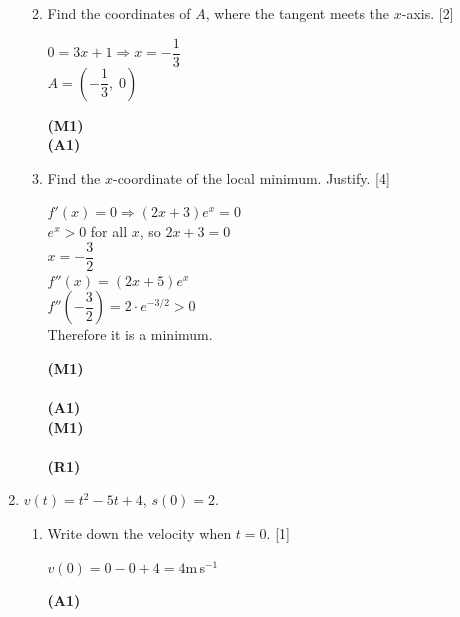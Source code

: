 \documentclass[12pt, twoside]{article}
\begin{document}
\begin{enumerate}[itemsep=0.2cm]
\begin{enumerate}[itemsep=0.3cm]
  \medskip
  \item Find the coordinates of $A$, where the tangent meets the $x$-axis. \hfill [2]

  \begin{minipage}[t]{0.62\textwidth}
  $0 = 3x + 1 \Rightarrow x = -\dfrac{1}{3}$\\[0.2cm]
  $A = \left(-\dfrac{1}{3},\; 0\right)$
  \end{minipage}%
  \begin{minipage}[t]{0.35\textwidth}\raggedleft
  \textbf{(M1)}\\[0.2cm]
  \textbf{(A1)}
  \end{minipage}

  \medskip
  \item Find the $x$-coordinate of the local minimum. Justify. \hfill [4]

  \begin{minipage}[t]{0.62\textwidth}
  $f'(x) = 0 \Rightarrow (2x + 3)e^x = 0$\\[0.15cm]
  $e^x > 0$ for all $x$, so $2x + 3 = 0$\\[0.15cm]
  $x = -\dfrac{3}{2}$\\[0.2cm]
  $f''(x) = (2x + 5)e^x$\\[0.15cm]
  $f''\!\left(-\dfrac{3}{2}\right) = 2 \cdot e^{-3/2} > 0$\\[0.15cm]
  Therefore it is a minimum.
  \end{minipage}%
  \begin{minipage}[t]{0.35\textwidth}\raggedleft
  \textbf{(M1)}\\[0.15cm]
  ~\\[0.15cm]
  \textbf{(A1)}\\[0.2cm]
  \textbf{(M1)}\\[0.15cm]
  ~\\[0.15cm]
  \textbf{(R1)}
  \end{minipage}
\end{enumerate}

\bigskip

\item $v(t) = t^2 - 5t + 4$, \quad $s(0) = 2$.

\begin{enumerate}[itemsep=0.3cm]
  \item Write down the velocity when $t = 0$. \hfill [1]

  \begin{minipage}[t]{0.62\textwidth}
  $v(0) = 0 - 0 + 4 = 4$\;m\,s$^{-1}$
  \end{minipage}%
  \begin{minipage}[t]{0.35\textwidth}\raggedleft
  \textbf{(A1)}
  \end{minipage}


\end{enumerate}
\end{enumerate}
\end{document}
